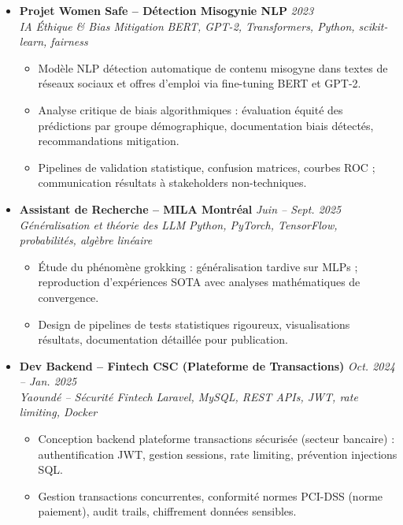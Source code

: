 \documentclass[a4paper,11pt]{article}
\begin{document}
\begin{itemize}[leftmargin=*, label={-}]
    \item \textbf{Projet Women Safe -- D\'etection Misogynie NLP} \hfill \textit{2023} \\
    \textit{IA \'Ethique \& Bias Mitigation} \hfill \textit{BERT, GPT-2, Transformers, Python, scikit-learn, fairness}
    \vspace{-2pt}
    \begin{itemize}[leftmargin=0.4cm, nosep, label=\tiny$\bullet$]
        \item \small{Mod\`ele NLP détection automatique de contenu misogyne dans textes de réseaux sociaux et offres d'emploi via fine-tuning BERT et GPT-2.}
        \item \small{Analyse critique de biais algorithmiques : \'evaluation équité des prédictions par groupe démographique, documentation biais détectés, recommandations mitigation.}
        \item \small{Pipelines de validation statistique, confusion matrices, courbes ROC ; communication résultats à stakeholders non-techniques.}
    \end{itemize}
    \vspace{3pt}

    \item \textbf{Assistant de Recherche -- MILA Montréal} \hfill \textit{Juin -- Sept. 2025} \\
    \textit{Généralisation et théorie des LLM} \hfill \textit{Python, PyTorch, TensorFlow, probabilités, algèbre linéaire}
    \vspace{-2pt}
    \begin{itemize}[leftmargin=0.4cm, nosep, label=\tiny$\bullet$]
        \item \small{Étude du phénomène grokking : généralisation tardive sur MLPs ; reproduction d'expériences SOTA avec analyses mathématiques de convergence.}
        \item \small{Design de pipelines de tests statistiques rigoureux, visualisations résultats, documentation détaillée pour publication.}
    \end{itemize}
    \vspace{3pt}

    \item \textbf{Dev Backend -- Fintech CSC (Plateforme de Transactions)} \hfill \textit{Oct. 2024 -- Jan. 2025} \\
    \textit{Yaoundé -- Sécurité Fintech} \hfill \textit{Laravel, MySQL, REST APIs, JWT, rate limiting, Docker}
    \vspace{-2pt}
    \begin{itemize}[leftmargin=0.4cm, nosep, label=\tiny$\bullet$]
        \item \small{Conception backend plateforme transactions sécurisée (secteur bancaire) : authentification JWT, gestion sessions, rate limiting, prévention injections SQL.}
        \item \small{Gestion transactions concurrentes, conformité normes PCI-DSS (norme paiement), audit trails, chiffrement données sensibles.}
    \end{itemize}
    \vspace{3pt}


\end{itemize}
\end{document}
